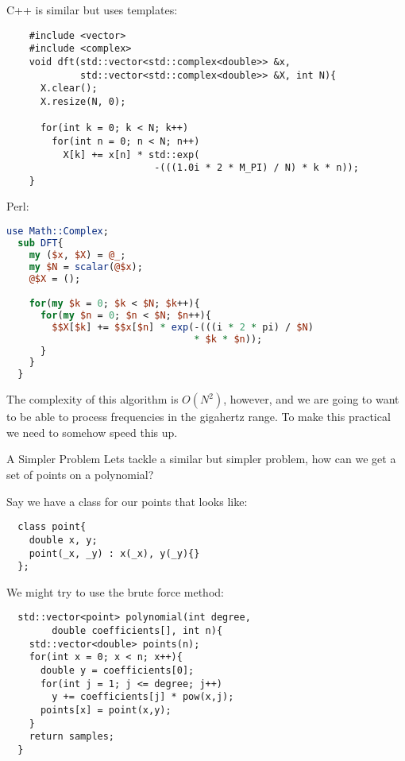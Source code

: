 \documentclass{beamer}
\begin{document}
\begin{frame}[fragile]
  C++ is similar but uses templates:
  \begin{lstlisting}
    #include <vector>
    #include <complex>
    void dft(std::vector<std::complex<double>> &x, 
             std::vector<std::complex<double>> &X, int N){
      X.clear();
      X.resize(N, 0);
  
      for(int k = 0; k < N; k++)
        for(int n = 0; n < N; n++)
          X[k] += x[n] * std::exp(
                          -(((1.0i * 2 * M_PI) / N) * k * n));
    }
  \end{lstlisting}
\end{frame}
\begin{frame}[fragile]

  Perl:
  \begin{lstlisting}[language=Perl]
  use Math::Complex;
  sub DFT{
    my ($x, $X) = @_;
    my $N = scalar(@$x);
    @$X = ();

    for(my $k = 0; $k < $N; $k++){
      for(my $n = 0; $n < $N; $n++){
        $$X[$k] += $$x[$n] * exp(-(((i * 2 * pi) / $N)
                                 * $k * $n));
      }
    }
  }
\end{lstlisting}

  The complexity of this algorithm is $O(N^2)$, however, and we are going to want to be able to process frequencies in the gigahertz range. To make this practical we need to somehow speed this up.

\end{frame}
\begin{frame}[fragile]{A Simpler Problem}
  Lets tackle a similar but simpler problem, how can we get a set of points on a polynomial?

  Say we have a class for our points that looks like:
  \begin{lstlisting}
  class point{
    double x, y;
    point(_x, _y) : x(_x), y(_y){}
  };
\end{lstlisting}
  We might try to use the brute force method:
  \begin{lstlisting}
  std::vector<point> polynomial(int degree,
        double coefficients[], int n){
    std::vector<double> points(n);
    for(int x = 0; x < n; x++){
      double y = coefficients[0];
      for(int j = 1; j <= degree; j++)
        y += coefficients[j] * pow(x,j);
      points[x] = point(x,y);
    }
    return samples;
  }
\end{lstlisting}
\end{frame}
\end{document}
